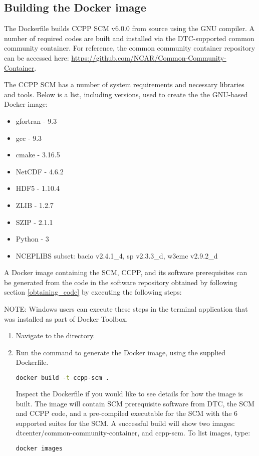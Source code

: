 \subsection{Building the Docker image}

The Dockerfile builds CCPP SCM v6.0.0 from source using the GNU compiler. A number of required codes are built and installed via the DTC-supported common community container. For reference, the common community container repository can be accessed here: \url{https://github.com/NCAR/Common-Community-Container}.

The CCPP SCM has a number of system requirements and necessary libraries and tools. Below is a list, including versions, used to create the the GNU-based Docker image:
\begin{itemize}
\item gfortran - 9.3
\item gcc - 9.3
\item cmake - 3.16.5
\item NetCDF - 4.6.2
\item HDF5 - 1.10.4
\item ZLIB - 1.2.7
\item SZIP - 2.1.1
\item Python - 3
\item NCEPLIBS subset: bacio v2.4.1\_4, sp v2.3.3\_d, w3emc v2.9.2\_d
\end{itemize}

A Docker image containing the SCM, CCPP, and its software prerequisites can be generated from the code in the software repository obtained by following section \ref{obtaining_code} by executing the following steps:

NOTE: Windows users can execute these steps in the terminal application that was installed as part of Docker Toolbox.

\begin{enumerate}
\item Navigate to the  directory.
\item Run the  command to generate the Docker image, using the supplied Dockerfile.
\begin{lstlisting}[language=bash]
docker build -t ccpp-scm .
\end{lstlisting}
Inspect the Dockerfile if you would like to see details for how the image is built. The image will contain SCM prerequisite software from DTC, the SCM and CCPP code, and a pre-compiled executable for the SCM with the 6 supported suites for the SCM. A successful build will show two images: dtcenter/common-community-container, and ccpp-scm. To list images, type:
\begin{lstlisting}[language=bash]
docker images
\end{lstlisting}
\end{enumerate}

